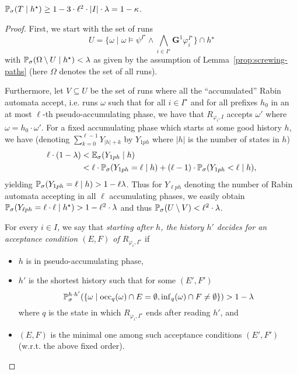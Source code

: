 \documentclass[a4paper,UKenglish]{lipics}
\newcommand{\Gf}[1]{\mathbf{G}^{#1}}
\newcommand{\Ex}[3][]{\ifblank{#1}{\mathbb{E}_{#2}}{\mathbb{E}^{#1}_{#2}}(#3)}
\renewcommand{\Pr}[3][]{\ifblank{#1}{\mathbb{P}_{#2}}{\mathbb{P}^{#1}_{#2}}(#3)}
\newcommand{\rabin}{R}
\newcommand{\fix}[1]{{#1^\star}}
\newcommand{\fixI}{\fix{I}}
\newcommand{\fixh}{\fix{h}}
\newcommand{\occu}{\mathrm{occ}}
\newcommand{\infi}{\mathrm{inf}}
\begin{document}
\begin{lemma}\label{lemma:alternating-runs}
	$\Pr{\sigma}{T \mid \fixh} \ge 1-3 \cdot \ell^2 \cdot |I|\cdot \lambda = 1-\kappa$. 
\end{lemma}
\begin{proof} 
	First, we start with the set of runs
	$$U = \{\omega \mid \omega\models\psi^\fixI \wedge \bigwedge_{i\in \fixI} \Gf{1} \varphi^\fixI_i\} \cap \fixh$$
	with $\Pr{\sigma}{\Omega \setminus U \mid \fixh} < \lambda$ as given by the assumption of Lemma~\ref{prop:screwing-paths} (here $\Omega$ denotes the set of all runs).
	
	Furthermore, let $V \subseteq U$ be the set of runs where all the ``accumulated'' Rabin automata accept, i.e. runs $\omega$ such that for all $i \in \fixI$ and for all prefixes $h_0$ in an at most $\ell$-th pseudo-accumulating phase, we have that $\rabin_{\varphi_i,I}$ accepts $\omega'$ where $\omega = h_0 \cdot \omega'$.
For a fixed accumulating phase which starts at some good history $h$, we have (denoting $\sum_{k=0}^{\ell-1} Y_{|h|+k}$ by $Y_{1ph}$ where $|h|$ is the number of states in $h$)
	\begin{align*}
	\ell\cdot(1-\lambda) 
	&< \Ex{\sigma}{Y_{1ph} \mid h}  \\
	&< \ell \cdot \Pr{\sigma}{Y_{1ph} = \ell \mid h} + (\ell - 1) \cdot \Pr{\sigma}{Y_{1ph} < \ell \mid h},
	\end{align*}
	yielding $\Pr{\sigma}{Y_{1ph} = \ell \mid h} > 1-\ell\lambda$. Thus for $Y_{\ell ph}$ denoting the number of Rabin automata accepting in all $\ell$ accumulating phases, we easily obtain $\Pr{\sigma}{Y_{\ell ph} = \ell \cdot \ell \mid \fixh} > 1-\ell^2\cdot \lambda$ and thus $\Pr{\sigma}{U \setminus V} < \ell^2\cdot \lambda$.
	
	For every $i \in I$, we say that \emph{starting after $h$, the history $h'$ decides for an acceptance condition $(E,F)$ of $\rabin_{\varphi_i,\fixI}$} if
	\begin{itemize}
		\item $h$ is in pseudo-accumulating phase, 
		\item $h'$ is the shortest history such that for some $(E',F')$ 
		$$\Pr[h\cdot h']{\sigma}{\{\omega \mid \occu_{q}(\omega)\cap E = \emptyset, \infi_{q}(\omega) \cap F \neq \emptyset \}} > 1-\lambda$$
		where $q$ is the state in which $\rabin_{\varphi_i,\fixI}$ ends after reading $h'$, and
		\item $(E,F)$ is the minimal one among such acceptance conditions $(E',F')$ (w.r.t. the above fixed order).
	\end{itemize}   
	

\end{proof}
\end{document}

